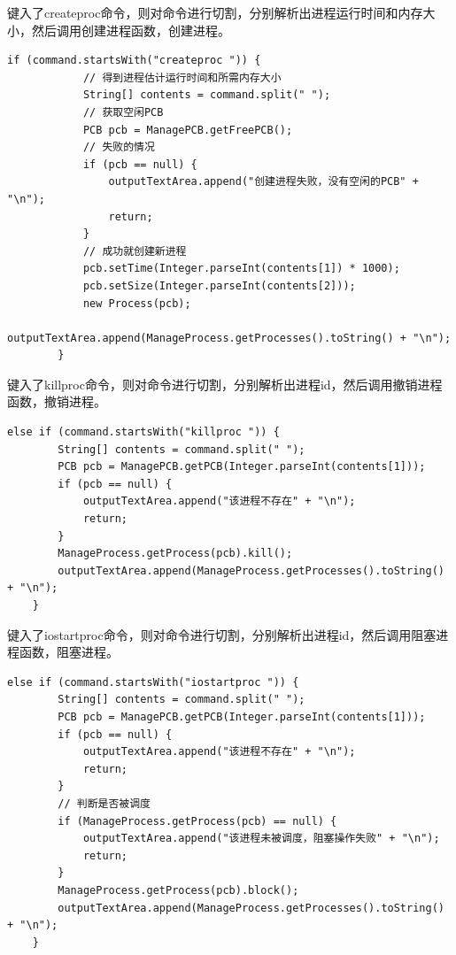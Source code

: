 \documentclass[UTF8,12pt]{article}
\begin{document}
键入了createproc命令，则对命令进行切割，分别解析出进程运行时间和内存大小，然后调用创建进程函数，创建进程。

\begin{lstlisting}[title=键入createproc,frame=shadowbox]
    if (command.startsWith("createproc ")) {
            // 得到进程估计运行时间和所需内存大小
            String[] contents = command.split(" ");
            // 获取空闲PCB
            PCB pcb = ManagePCB.getFreePCB();
            // 失败的情况
            if (pcb == null) {
                outputTextArea.append("创建进程失败，没有空闲的PCB" + "\n");
                return;
            }
            // 成功就创建新进程
            pcb.setTime(Integer.parseInt(contents[1]) * 1000);
            pcb.setSize(Integer.parseInt(contents[2]));
            new Process(pcb);
            outputTextArea.append(ManageProcess.getProcesses().toString() + "\n");
        }
\end{lstlisting}

键入了killproc命令，则对命令进行切割，分别解析出进程id，然后调用撤销进程函数，撤销进程。

\begin{lstlisting}[title=键入killproc,frame=shadowbox]
    else if (command.startsWith("killproc ")) {
        String[] contents = command.split(" ");
        PCB pcb = ManagePCB.getPCB(Integer.parseInt(contents[1]));
        if (pcb == null) {
            outputTextArea.append("该进程不存在" + "\n");
            return;
        }
        ManageProcess.getProcess(pcb).kill();
        outputTextArea.append(ManageProcess.getProcesses().toString() + "\n");
    }
\end{lstlisting}

键入了iostartproc命令，则对命令进行切割，分别解析出进程id，然后调用阻塞进程函数，阻塞进程。

\begin{lstlisting}[title=键入iostartproc,frame=shadowbox]
    else if (command.startsWith("iostartproc ")) {
        String[] contents = command.split(" ");
        PCB pcb = ManagePCB.getPCB(Integer.parseInt(contents[1]));
        if (pcb == null) {
            outputTextArea.append("该进程不存在" + "\n");
            return;
        }
        // 判断是否被调度
        if (ManageProcess.getProcess(pcb) == null) {
            outputTextArea.append("该进程未被调度，阻塞操作失败" + "\n");
            return;
        }
        ManageProcess.getProcess(pcb).block();
        outputTextArea.append(ManageProcess.getProcesses().toString() + "\n");
    }
\end{lstlisting}
\end{document}
